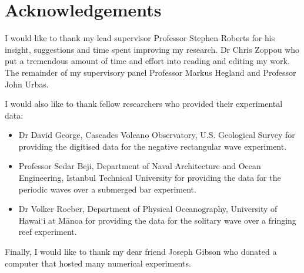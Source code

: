 
\chapter*{Acknowledgements}\label{acknowledgements}

I would like to thank my lead supervisor Professor Stephen Roberts for his insight, suggestions and time spent improving my research. Dr Chris Zoppou who put a tremendous amount of time and effort into reading and editing my work. The remainder of my supervisory panel Professor Markus Hegland and Professor John Urbas.

I would also like to thank fellow researchers who provided their experimental data:
\begin{itemize}
	\item Dr David George, Cascades Volcano Observatory, U.S. Geological Survey for providing the digitised data for the negative rectangular wave experiment.
	\item Professor Sedar Beji, Department of Naval Architecture and Ocean Engineering, Istanbul Technical University for providing the data for the periodic waves over a submerged bar experiment.
	\item Dr Volker Roeber, Department of Physical Oceanography, University of Hawai`i at M\={a}noa for providing the data for the solitary wave over a fringing reef experiment.
\end{itemize}

Finally, I would like to thank my dear friend Joseph Gibson who donated a computer that hosted many numerical experiments. 
